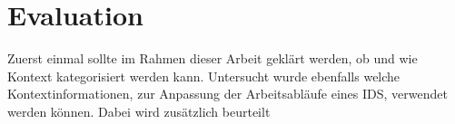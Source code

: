\chapter{Evaluation}%
\label{cha:evaluation}



Zuerst einmal sollte im Rahmen dieser Arbeit geklärt werden, ob und wie Kontext kategorisiert werden kann. Untersucht wurde ebenfalls welche Kontextinformationen, zur Anpassung der Arbeitsabläufe eines IDS, verwendet werden können.  
 Dabei wird zusätzlich beurteilt

